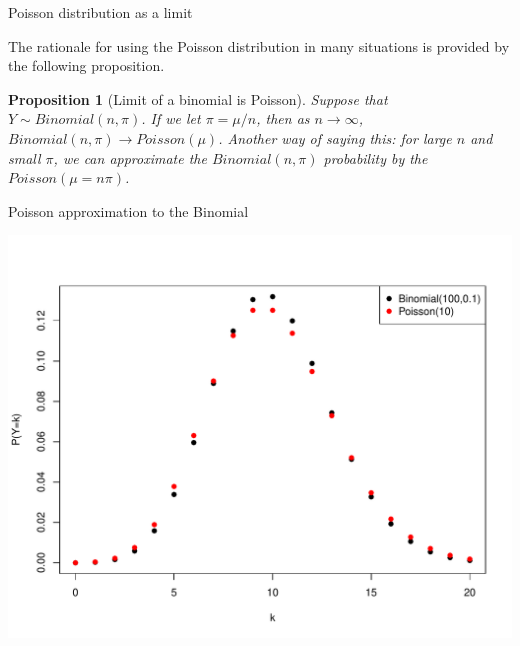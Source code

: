\documentclass{beamer}\usepackage[]{graphicx}\usepackage[]{color}
\newenvironment{knitrout}{}{} %
\newtheorem{proposition}[theorem]{Proposition}
\begin{document}
\begin{frame}{Poisson distribution as a limit}

The rationale for using the Poisson distribution in many situations is provided by the following proposition.

\vspace*{0.5in}

\begin{proposition}[Limit of a binomial is Poisson]
	Suppose that $Y \sim Binomial(n,\pi)$. If we let $\pi = \mu/n$, then as $n \rightarrow \infty$, $Binomial(n,\pi) \rightarrow Poisson(\mu)$. Another way of saying this: for large $n$ and small $\pi$, we can approximate the $Binomial(n,\pi)$ probability by the $Poisson(\mu = n\pi)$. 
\end{proposition}

\end{frame}


\begin{frame}{Poisson approximation to the Binomial}


\begin{knitrout}\scriptsize
{}\color{fgcolor}

{\centering \includegraphics[width=1\linewidth]{figure/unnamed-chunk-8-1} 

}



\end{knitrout}

\end{frame}
\end{document}

